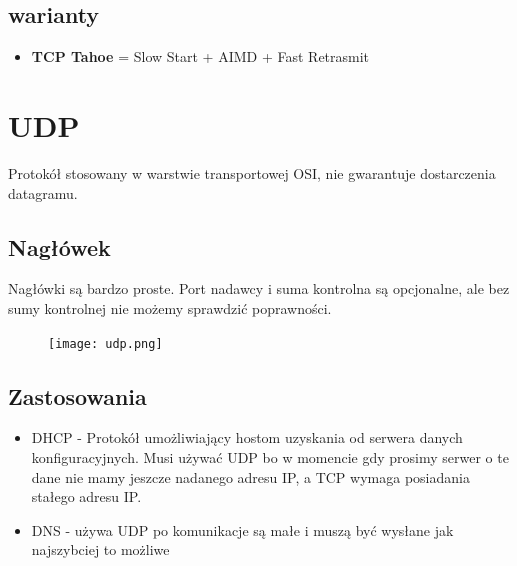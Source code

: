 \documentclass[]{article}
\begin{document}
\subsection{warianty}
\begin{itemize}
    \item \textbf{TCP Tahoe} = Slow Start + AIMD + Fast Retrasmit
\end{itemize}
\section{UDP}
Protokół stosowany w warstwie transportowej OSI, nie gwarantuje dostarczenia datagramu.
\subsection{Nagłówek}
Nagłówki są bardzo proste. Port nadawcy i suma kontrolna są opcjonalne, ale bez sumy kontrolnej nie możemy sprawdzić poprawności.
\begin{figure}[H]
    \centering
    \texttt{[image: udp.png]}
\end{figure}
\subsection{Zastosowania}
\begin{itemize}
    \item DHCP - Protokół umożliwiający hostom uzyskania od serwera danych konfiguracyjnych. Musi używać UDP bo w momencie gdy prosimy serwer o te dane nie mamy jeszcze nadanego adresu IP, a TCP wymaga posiadania stałego adresu IP.
    \item DNS - używa UDP po komunikacje są małe i muszą być wysłane jak najszybciej to możliwe
\end{itemize}
\end{document}
